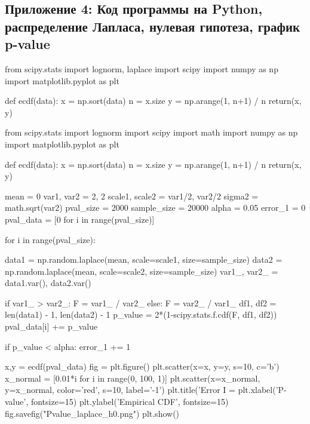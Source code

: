 \documentclass[12pt]{disser}
\begin{document}
\subsection*{Приложение 4: Код программы на Python, распределение Лапласа, нулевая гипотеза, график p-value}
\begin{python}
from scipy.stats import lognorm, laplace
import scipy
import numpy as np
import matplotlib.pyplot as plt


def ecdf(data):
    x = np.sort(data)
    n = x.size
    y = np.arange(1, n+1) / n
    return(x, y)


from scipy.stats import lognorm
import scipy
import math
import numpy as np
import matplotlib.pyplot as plt


def ecdf(data):
    x = np.sort(data)
    n = x.size
    y = np.arange(1, n+1) / n
    return(x, y)


mean = 0
var1, var2 = 2, 2
scale1, scale2 = var1/2, var2/2
sigma2 = math.sqrt(var2)
pval_size = 2000
sample_size = 20000
alpha = 0.05
error_1 = 0
pval_data = [0 for i in range(pval_size)]

for i in range(pval_size):

    data1 = np.random.laplace(mean, scale=scale1, size=sample_size)
    data2 = np.random.laplace(mean, scale=scale2, size=sample_size)
    var1_, var2_ = data1.var(), data2.var()

    if var1_ > var2_:
        F = var1_ / var2_
    else:
        F = var2_ / var1_
    df1, df2 = len(data1) - 1, len(data2) - 1
    p_value = 2*(1-scipy.stats.f.cdf(F, df1, df2))
    pval_data[i] += p_value

    if p_value < alpha:
        error_1 += 1

x,y = ecdf(pval_data)
fig = plt.figure()
plt.scatter(x=x, y=y, s=10, c='b')
x_normal = [0.01*i for i in range(0, 100, 1)]
plt.scatter(x=x_normal, y=x_normal, color='red', s=10, label='-1')
plt.title('Error I = %
plt.xlabel('P-value', fontsize=15)
plt.ylabel('Empirical CDF', fontsize=15)
fig.savefig("Pvalue_laplace_h0.png")
plt.show()
\end{python}
\end{document}
